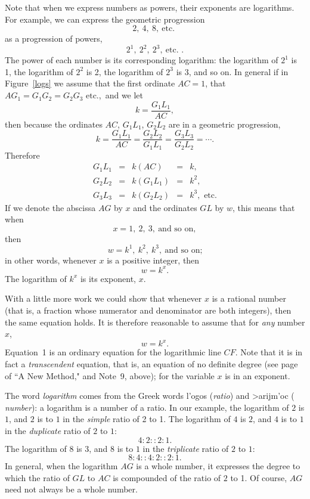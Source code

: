 \documentclass[polutonikogreek,english,twoside,openright]{article}
\newlength{\oldjot}
\begin{document}
Note that when we express numbers as powers, their exponents are
logarithms.  For example, we can express the geometric progression
$$2,\ 4,\ 8,\ \mbox{etc. }$$
as a progression of powers,
$$2^1,\ 2^2,\ 2^3,\ \mbox{etc. }.$$
The power of each number is its corresponding logarithm: the logarithm
of $2^1$ is 1, the logarithm of $2^2$ is 2, the logarithm of $2^3$ is
3, and so on.  In general if in Figure~\ref{logs} we assume that the
first ordinate $AC=1$, that $AG_1= G_1G_2= G_2G_3 \mbox{ etc.}$,\ and
we let
$$k = \frac{G_1L_1}{AC},$$
then because the ordinates $AC$, $G_1L_1$, $G_2L_2$ are in a geometric progression, 
$$k = \frac{G_1L_1}{AC} = \frac{G_2L_2}{G_1L_1} =  \frac{G_3L_3}{G_2L_2} =  \cdots.$$
Therefore
$$\begin{array}{lclcl}
G_1L_1 & = & k(AC )&  =&  k,\\
G_2L_2 &  = & k(G_1L_1) & = & k^2,\\
G_3L_3 &  = & k(G_2L_2) & = & k^3,\mbox{ etc.}
\end{array}$$
\setlength{\jot}{\oldjot}
\hspace{-.6em} If we denote the abscissa $AG$ by $x$ and the ordinates $GL$ by $w$, this means that when 
$$x = 1,\ 2,\ 3,\ \mbox{and so on},$$
then
$$w = k^1,\ k^2,\ k^3,\ \mbox{and so on;}$$
in other words, whenever $x$ is a positive integer, then
$$w = k^x.$$
The logarithm of $k^x$ is its exponent, $x$.

With a little more work we could show that whenever $x$ is a rational
number (that is, a fraction whose numerator and denominator are both
integers), then the same equation holds.  It is therefore reasonable
to assume that for {\em any} number $x$, \setcounter{equation}{0}
\begin{equation}
w = k^x.
\end{equation}
Equation~1 is an ordinary equation for the logarithmic line $CF$.
Note that it is in fact a {\em transcendent} equation, that is, an
equation of no definite degree (see page~\pageref{trandef} of ``A New
Method," and Note~9, above); for the variable $x$ is in an exponent.

The word {\em logarithm} comes from the Greek words
l'ogos ({\em ratio}) and
>arijm'oc ({\em
  number}): a logarithm is a number of a ratio.
In our example, the logarithm of $2$ is $1$, and $2$ is to $1$ in the
{\em simple} ratio of 2 to 1.  The logarithm of $4$ is $2$, and $4$ is
to $1$ in the {\em duplicate} ratio of $2$ to $1$:
$$4\!:\! 2 :: 2\!:\! 1.$$
The logarithm of $8$ is $3$, and $8$ is to $1$ in the {\em triplicate} ratio of $2$ to $1$:
$$8\!:\!  4 :: 4\!:\! 2 :: 2\!:\! 1.$$
In general, when the logarithm $AG$ is a whole number, it expresses
the degree to which the ratio of $GL$ to $AC$ is compounded of the
ratio of $2$ to 1.  Of course, $AG$ need not always be a whole number.
\end{document}

